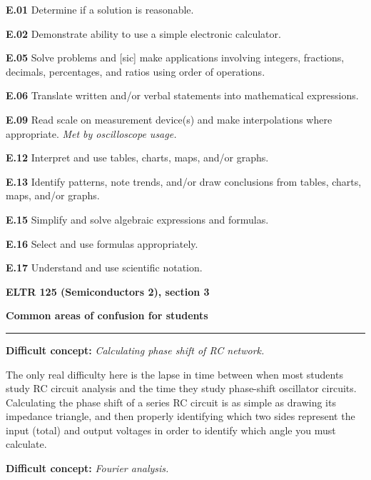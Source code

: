 \item{\bf E.01} Determine if a solution is reasonable.
\item{\bf E.02} Demonstrate ability to use a simple electronic calculator.
\item{\bf E.05} Solve problems and [sic] make applications involving integers, fractions, decimals, percentages, and ratios using order of operations.
\item{\bf E.06} Translate written and/or verbal statements into mathematical expressions.
\item{\bf E.09} Read scale on measurement device(s) and make interpolations where appropriate.  {\it Met by oscilloscope usage.}
\item{\bf E.12} Interpret and use tables, charts, maps, and/or graphs.
\item{\bf E.13} Identify patterns, note trends, and/or draw conclusions from tables, charts, maps, and/or graphs.
\item{\bf E.15} Simplify and solve algebraic expressions and formulas.
\item{\bf E.16} Select and use formulas appropriately.
\item{\bf E.17} Understand and use scientific notation.
\medskip





\vfil \eject

\centerline{\bf ELTR 125 (Semiconductors 2), section 3} \bigskip 
 
\vskip 10pt

\noindent
{\bf Common areas of confusion for students}

\vskip 5pt

\hrule \vskip 5pt

\vskip 10pt

\noindent
{\bf Difficult concept: } {\it Calculating phase shift of RC network.}

The only real difficulty here is the lapse in time between when most students study RC circuit analysis and the time they study phase-shift oscillator circuits.  Calculating the phase shift of a series RC circuit is as simple as drawing its impedance triangle, and then properly identifying which two sides represent the input (total) and output voltages in order to identify which angle you must calculate.

\vskip 10pt

\noindent
{\bf Difficult concept: } {\it Fourier analysis.}

